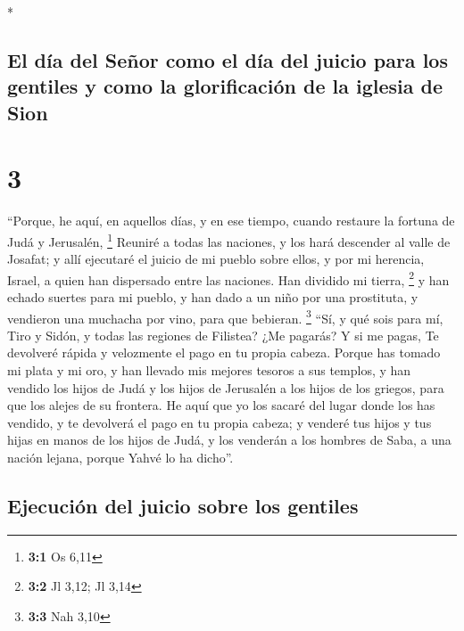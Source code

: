\begin{paracol}{2}
\begin{otherlanguage}{english}
\end{otherlanguage}

\switchcolumn[0]*

\hypertarget{el-duxeda-del-seuxf1or-como-el-duxeda-del-juicio-para-los-gentiles-y-como-la-glorificaciuxf3n-de-la-iglesia-de-sion}{%
\subsection{El día del Señor como el día del juicio para los gentiles y
como la glorificación de la iglesia de
Sion}\label{el-duxeda-del-seuxf1or-como-el-duxeda-del-juicio-para-los-gentiles-y-como-la-glorificaciuxf3n-de-la-iglesia-de-sion}}

\hypertarget{section-4}{%
\section{3}\label{section-4}}

 ``Porque, he aquí, en aquellos días, y en ese tiempo,
cuando restaure la fortuna de Judá y Jerusalén, \footnote{\textbf{3:1}
  Os 6,11}  Reuniré a todas las naciones, y los hará
descender al valle de Josafat; y allí ejecutaré el juicio de mi pueblo
sobre ellos, y por mi herencia, Israel, a quien han dispersado entre las
naciones. Han dividido mi tierra, \footnote{\textbf{3:2} Jl 3,12; Jl
  3,14}  y han echado suertes para mi pueblo, y han dado a
un niño por una prostituta, y vendieron una muchacha por vino, para que
bebieran. \footnote{\textbf{3:3} Nah 3,10}  ``Sí, y qué
sois para mí, Tiro y Sidón, y todas las regiones de Filistea? ¿Me
pagarás? Y si me pagas, Te devolveré rápida y velozmente el pago en tu
propia cabeza.  Porque has tomado mi plata y mi oro, y han
llevado mis mejores tesoros a sus templos,  y han vendido
los hijos de Judá y los hijos de Jerusalén a los hijos de los griegos,
para que los alejes de su frontera.  He aquí que yo los
sacaré del lugar donde los has vendido, y te devolverá el pago en tu
propia cabeza;  y venderé tus hijos y tus hijas en manos
de los hijos de Judá, y los venderán a los hombres de Saba, a una nación
lejana, porque Yahvé lo ha dicho''.

\hypertarget{ejecuciuxf3n-del-juicio-sobre-los-gentiles}{%
\subsection{Ejecución del juicio sobre los
gentiles}\label{ejecuciuxf3n-del-juicio-sobre-los-gentiles}}


\end{paracol}
